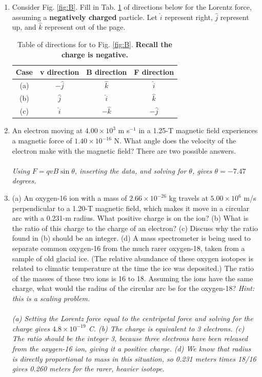 \documentclass[12pt,twocolumn]{article}
\begin{document}
\noindent
\begin{enumerate}
\item Consider Fig. \ref{fig:B}. Fill in Tab. \ref{tab:ex} of directions below for the Lorentz force, assuming a \textbf{negatively charged} particle.  Let $\hat{i}$ represent right, $\hat{j}$ represent up, and $\hat{k}$ represent out of the page.
\begin{table}
\centering
\begin{tabular}{| c | c | c | c |}
\hline
Case & v direction & B direction & F direction \\ \hline
(a) & $-\hat{j}$ & $\hat{k}$ & $\hat{i}$ \\ \hline
(b) & $\hat{j}$ & $\hat{i}$ & $\hat{k}$ \\ \hline
(c) & $\hat{i}$ & $-\hat{k}$ & $-\hat{j}$ \\ \hline
\end{tabular}
\caption{\label{tab:ex} Table of directions for to Fig. \ref{fig:B}. \textbf{Recall the charge is negative.}}
\end{table}
\item An electron moving at $4.00\times 10^3$ m s$^{-1}$ in a 1.25-T magnetic field experiences a magnetic force of $1.40\times 10^{-16}$ N. What angle does the velocity of the electron make with the magnetic field? There are two possible answers. \\ \\
\textit{Using $F = qvB\sin\theta$, inserting the data, and solving for $\theta$, gives $\theta = -7.47$ degrees.}
\item (a) An oxygen-16 ion with a mass of $2.66\times 10^{-26}$ kg travels at $5.00\times 10^6$ m/s perpendicular to a 1.20-T magnetic field, which makes it move in a circular arc with a 0.231-m radius. What positive charge is on the ion? (b) What is the ratio of this charge to the charge of an electron? (c) Discuss why the ratio found in (b) should be an integer. (d) A mass spectrometer is being used to separate common oxygen-16 from the much rarer oxygen-18, taken from a sample of old glacial ice. (The relative abundance of these oxygen isotopes is related to climatic temperature at the time the ice was deposited.) The ratio of the masses of these two ions is 16 to 18.  Assuming the ions have the same charge, what would the radius of the circular arc be for the oxygen-18?  \textit{Hint: this is a scaling problem.} \\ \\
\textit{(a) Setting the Lorentz force equal to the centripetal force and solving for the charge gives $4.8 \times 10^{-19}$ C. (b) The charge is equivalent to 3 electrons. (c) The ratio should be the integer 3, because three electrons have been released from the oxygen-16 ion, giving it a positive charge. (d) We know that radius is directly proportional to mass in this situation, so 0.231 meters times 18/16 gives 0.260 meters for the rarer, heavier isotope.}

\end{enumerate}
\end{document}
